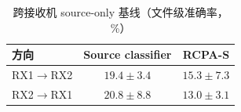 \begin{table}[htbp]
  \centering
  \caption{跨接收机 source-only 基线（文件级准确率，\%）}
  \label{tab:ch4_baseline}
  \begin{tabular}{lcc}
    \toprule
    方向 & Source classifier & RCPA-S \\
    \midrule
    RX1$\rightarrow$RX2 & $19.4\pm3.4$ & $15.3\pm7.3$ \\
    RX2$\rightarrow$RX1 & $20.8\pm8.8$ & $13.0\pm3.1$ \\
    \bottomrule
  \end{tabular}
\end{table}
